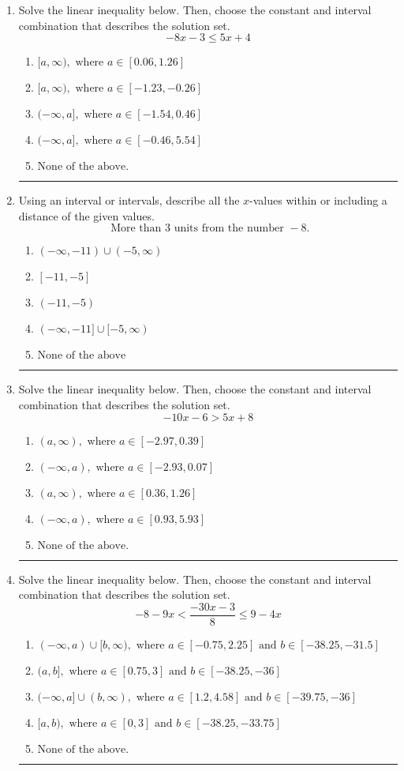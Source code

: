 \documentclass[14pt]{extbook}
\newcommand{\litem}[1]{\item#1\hspace*{-1cm}\rule{\textwidth}{0.4pt}}
\begin{document}
\begin{enumerate}
{\begin{enumerate}[label=\Alph*.]
\end{enumerate} }
\litem{
Solve the linear inequality below. Then, choose the constant and interval combination that describes the solution set.\[ -8x -3 \leq 5x + 4 \]\begin{enumerate}[label=\Alph*.]
\item \( [a, \infty), \text{ where } a \in [0.06, 1.26] \)
\item \( [a, \infty), \text{ where } a \in [-1.23, -0.26] \)
\item \( (-\infty, a], \text{ where } a \in [-1.54, 0.46] \)
\item \( (-\infty, a], \text{ where } a \in [-0.46, 5.54] \)
\item \( \text{None of the above}. \)

\end{enumerate} }
\litem{
Using an interval or intervals, describe all the $x$-values within or including a distance of the given values.\[ \text{ More than } 3 \text{ units from the number } -8. \]\begin{enumerate}[label=\Alph*.]
\item \( (-\infty, -11) \cup (-5, \infty) \)
\item \( [-11, -5] \)
\item \( (-11, -5) \)
\item \( (-\infty, -11] \cup [-5, \infty) \)
\item \( \text{None of the above} \)

\end{enumerate} }
\litem{
Solve the linear inequality below. Then, choose the constant and interval combination that describes the solution set.\[ -10x -6 > 5x + 8 \]\begin{enumerate}[label=\Alph*.]
\item \( (a, \infty), \text{ where } a \in [-2.97, 0.39] \)
\item \( (-\infty, a), \text{ where } a \in [-2.93, 0.07] \)
\item \( (a, \infty), \text{ where } a \in [0.36, 1.26] \)
\item \( (-\infty, a), \text{ where } a \in [0.93, 5.93] \)
\item \( \text{None of the above}. \)

\end{enumerate} }
\litem{
Solve the linear inequality below. Then, choose the constant and interval combination that describes the solution set.\[ -8 - 9 x < \frac{-30 x - 3}{8} \leq 9 - 4 x \]\begin{enumerate}[label=\Alph*.]
\item \( (-\infty, a) \cup [b, \infty), \text{ where } a \in [-0.75, 2.25] \text{ and } b \in [-38.25, -31.5] \)
\item \( (a, b], \text{ where } a \in [0.75, 3] \text{ and } b \in [-38.25, -36] \)
\item \( (-\infty, a] \cup (b, \infty), \text{ where } a \in [1.2, 4.58] \text{ and } b \in [-39.75, -36] \)
\item \( [a, b), \text{ where } a \in [0, 3] \text{ and } b \in [-38.25, -33.75] \)
\item \( \text{None of the above.} \)


\end{enumerate}}
\end{enumerate}
\end{document}
